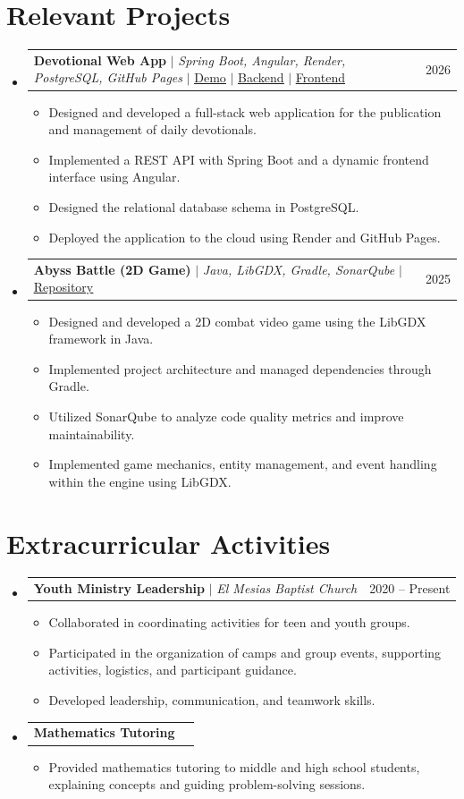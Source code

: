 \documentclass[letterpaper,12pt]{article}
\makeatletter
\newcommand{\resumeItem}[1]{
  \item\small{
    {#1 \vspace{-2pt}}
  }
}
\newcommand{\resumeProjectHeading}[2]{
    \item
    \begin{tabular*}{0.97\textwidth}{l@{\extracolsep{\fill}}r}
      \small#1 & #2 \\
    \end{tabular*}\vspace{-7pt}
}
\newcommand{\resumeSubHeadingListStart}{\begin{itemize}[leftmargin=0.15in, label={}]}
\newcommand{\resumeSubHeadingListEnd}{\end{itemize}}
\newcommand{\resumeItemListStart}{\begin{itemize}}
\newcommand{\resumeItemListEnd}{\end{itemize}\vspace{-5pt}}
\newcommand{\cvlink}[2]{\href{#1}{\underline{#2}}}
\makeatother
\begin{document}
\section{Relevant Projects}
    \resumeSubHeadingListStart
    \resumeProjectHeading
        {\textbf{Devotional Web App} $|$ \emph{Spring Boot, Angular, Render, PostgreSQL, GitHub Pages} $|$
        \cvlink{https://jarethjaziel.github.io/Devo-app/}{Demo} $|$
        \cvlink{https://github.com/JarethJaziel/Devo-Service}{Backend} $|$
        \cvlink{https://github.com/JarethJaziel/Devo-app}{Frontend}}{2026}
          \resumeItemListStart
                \resumeItem{Designed and developed a full-stack web application for the publication and management of daily devotionals.}
                \resumeItem{Implemented a REST API with Spring Boot and a dynamic frontend interface using Angular.}
                \resumeItem{Designed the relational database schema in PostgreSQL.}
                \resumeItem{Deployed the application to the cloud using Render and GitHub Pages.}
          \resumeItemListEnd
          
    
    \resumeProjectHeading
    {\textbf{Abyss Battle (2D Game)} $|$ \emph{Java, LibGDX, Gradle, SonarQube} $|$
    \cvlink{https://github.com/JarethJaziel/Abyss_Battle_Java_Game}{Repository}}{2025}
    \resumeItemListStart
        \resumeItem{Designed and developed a 2D combat video game using the LibGDX framework in Java.}
        \resumeItem{Implemented project architecture and managed dependencies through Gradle.}
        \resumeItem{Utilized SonarQube to analyze code quality metrics and improve maintainability.}
        \resumeItem{Implemented game mechanics, entity management, and event handling within the engine using LibGDX.}
    \resumeItemListEnd
    

    \resumeSubHeadingListEnd

\section{Extracurricular Activities}
    \resumeSubHeadingListStart
    \resumeProjectHeading
    {\textbf{Youth Ministry Leadership} $|$ \emph{El Mesias Baptist Church}}{2020 -- Present}
    \resumeItemListStart
        \resumeItem{Collaborated in coordinating activities for teen and youth groups.}
        \resumeItem{Participated in the organization of camps and group events, supporting activities, logistics, and participant guidance.}
        \resumeItem{Developed leadership, communication, and teamwork skills.}
    \resumeItemListEnd

    \resumeProjectHeading
    {\textbf{Mathematics Tutoring}}{}
    \resumeItemListStart
        \resumeItem{Provided mathematics tutoring to middle and high school students, explaining concepts and guiding problem-solving sessions.}
    \resumeItemListEnd
\resumeSubHeadingListEnd
\end{document}
